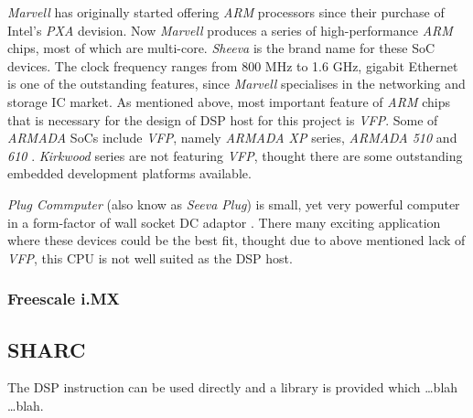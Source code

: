  \emph{Marvell} has originally started offering \emph{ARM} processors
 since their purchase of Intel's \emph{PXA} devision. Now \emph{Marvell}
 produces a series of high-performance \emph{ARM} chips, most of which
 are multi-core. \emph{Sheeva} is the brand name for these SoC devices.
 The clock frequency ranges from 800 MHz to 1.6 GHz, gigabit Ethernet
 is one of the outstanding features, since \emph{Marvell} specialises
 in the networking and storage IC market. As mentioned above, most
 important feature of \emph{ARM} chips that is necessary for the design
 of DSP host for this project is \emph{VFP}. Some of \emph{ARMADA}
 SoCs include \emph{VFP}, namely \emph{ARMADA XP} series,
 \emph{ARMADA 510} and \emph{610} \cite{links:marvell:armada}.
 \emph{Kirkwood} series are not featuring \emph{VFP}, thought there
 are some outstanding embedded development platforms available.

  \emph{Plug Commputer} (also know as \emph{Seeva Plug}) is small, yet
 very powerful computer in a form-factor of wall socket DC adaptor
 \cite{links:marvell:plug,links:plugcomp:homepage}. There many exciting
 application where these devices could be the best fit, thought due to
 above mentioned lack of \emph{VFP}, this CPU is not well suited as the
 DSP host.


\subsubsection{Freescale i.MX}



\subsection{SHARC}

  The DSP instruction can be used directly and a library is provided
 which \dots blah \dots blah.
